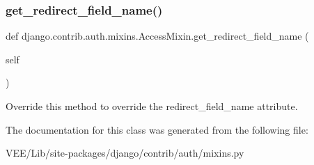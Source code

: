 \subsubsection{\texorpdfstring{get\+\_\+redirect\+\_\+field\+\_\+name()}{get\_redirect\_field\_name()}}
{\footnotesize\ttfamily def django.\+contrib.\+auth.\+mixins.\+Access\+Mixin.\+get\+\_\+redirect\+\_\+field\+\_\+name (\begin{DoxyParamCaption}\item[{}]{self }\end{DoxyParamCaption})}

\begin{DoxyVerb}Override this method to override the redirect_field_name attribute.
\end{DoxyVerb}
 

The documentation for this class was generated from the following file\+:\begin{DoxyCompactItemize}
\item 
V\+E\+E/\+Lib/site-\/packages/django/contrib/auth/mixins.\+py\end{DoxyCompactItemize}
